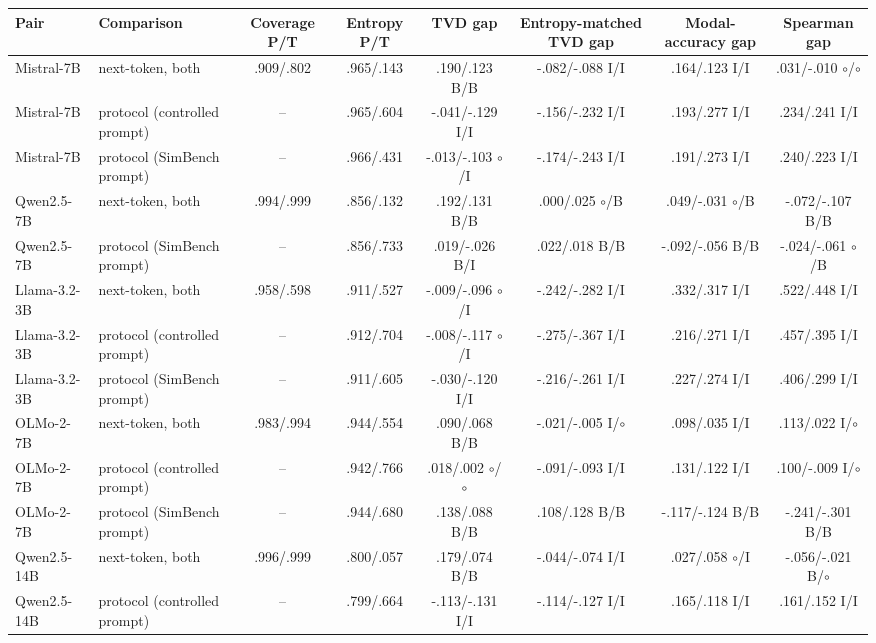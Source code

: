\begin{table}[t]
\centering\scriptsize
\setlength{\tabcolsep}{3pt}
\begin{tabular}{@{}llcccccc@{}}
\toprule
Pair & Comparison & Coverage P/T & Entropy P/T & TVD gap & Entropy-matched TVD gap & Modal-accuracy gap & Spearman gap \\
\midrule
Mistral-7B & next-token, both & .909/.802 & .965/.143 & .190/.123 B/B & -.082/-.088 I/I & .164/.123 I/I & .031/-.010 $\circ$/$\circ$ \\
Mistral-7B & protocol (controlled prompt) & -- & .965/.604 & -.041/-.129 I/I & -.156/-.232 I/I & .193/.277 I/I & .234/.241 I/I \\
Mistral-7B & protocol (SimBench prompt) & -- & .966/.431 & -.013/-.103 $\circ$/I & -.174/-.243 I/I & .191/.273 I/I & .240/.223 I/I \\
Qwen2.5-7B & next-token, both & .994/.999 & .856/.132 & .192/.131 B/B & .000/.025 $\circ$/B & .049/-.031 $\circ$/B & -.072/-.107 B/B \\
Qwen2.5-7B & protocol (SimBench prompt) & -- & .856/.733 & .019/-.026 B/I & .022/.018 B/B & -.092/-.056 B/B & -.024/-.061 $\circ$/B \\
Llama-3.2-3B & next-token, both & .958/.598 & .911/.527 & -.009/-.096 $\circ$/I & -.242/-.282 I/I & .332/.317 I/I & .522/.448 I/I \\
Llama-3.2-3B & protocol (controlled prompt) & -- & .912/.704 & -.008/-.117 $\circ$/I & -.275/-.367 I/I & .216/.271 I/I & .457/.395 I/I \\
Llama-3.2-3B & protocol (SimBench prompt) & -- & .911/.605 & -.030/-.120 I/I & -.216/-.261 I/I & .227/.274 I/I & .406/.299 I/I \\
OLMo-2-7B & next-token, both & .983/.994 & .944/.554 & .090/.068 B/B & -.021/-.005 I/$\circ$ & .098/.035 I/I & .113/.022 I/$\circ$ \\
OLMo-2-7B & protocol (controlled prompt) & -- & .942/.766 & .018/.002 $\circ$/$\circ$ & -.091/-.093 I/I & .131/.122 I/I & .100/-.009 I/$\circ$ \\
OLMo-2-7B & protocol (SimBench prompt) & -- & .944/.680 & .138/.088 B/B & .108/.128 B/B & -.117/-.124 B/B & -.241/-.301 B/B \\
Qwen2.5-14B & next-token, both & .996/.999 & .800/.057 & .179/.074 B/B & -.044/-.074 I/I & .027/.058 $\circ$/I & -.056/-.021 B/$\circ$ \\
Qwen2.5-14B & protocol (controlled prompt) & -- & .799/.664 & -.113/-.131 I/I & -.114/-.127 I/I & .165/.118 I/I & .161/.152 I/I \\

\end{tabular}
\end{table}
